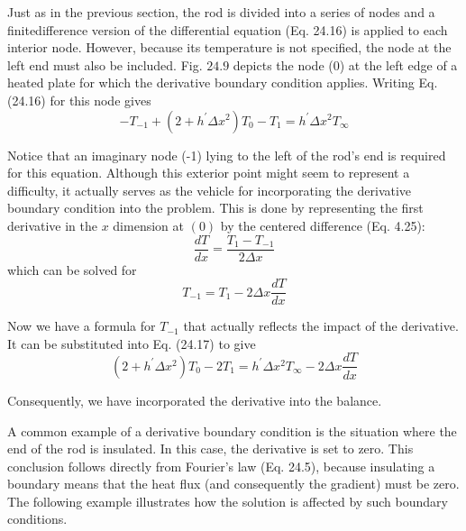 \documentclass[../main.tex]{subfiles}
\begin{document}
Just as in the previous section, the rod is divided into a series of nodes and a finitedifference version of the differential equation (Eq. 24.16) is applied to each interior node. However, because its temperature is not specified, the node at the left end must also be included. Fig. $24.9$ depicts the node (0) at the left edge of a heated plate for which the derivative boundary condition applies. Writing Eq. (24.16) for this node gives
\begin{equation}
    \tag{24.17}
    -T_{-1}+\left(2+h^{\prime} \Delta x^{2}\right) T_{0}-T_{1}=h^{\prime} \Delta x^{2} T_{\infty}
\end{equation}

Notice that an imaginary node (-1) lying to the left of the rod's end is required for this equation. Although this exterior point might seem to represent a difficulty, it actually serves as the vehicle for incorporating the derivative boundary condition into the problem. This is done by representing the first derivative in the $x$ dimension at $(0)$ by the centered difference (Eq. 4.25):
$$
\frac{d T}{d x}=\frac{T_{1}-T_{-1}}{2 \Delta x}
$$
which can be solved for
$$
T_{-1}=T_{1}-2 \Delta x \frac{d T}{d x}
$$

Now we have a formula for $T_{-1}$ that actually reflects the impact of the derivative. It can be substituted into Eq. (24.17) to give
\begin{equation}
    \tag{24.18}
    \left(2+h^{\prime} \Delta x^{2}\right) T_{0}-2 T_{1}=h^{\prime} \Delta x^{2} T_{\infty}-2 \Delta x \frac{d T}{d x}
\end{equation}

\noindent Consequently, we have incorporated the derivative into the balance.

A common example of a derivative boundary condition is the situation where the end of the rod is insulated. In this case, the derivative is set to zero. This conclusion follows directly from Fourier's law (Eq. 24.5), because insulating a boundary means that the heat flux (and consequently the gradient) must be zero. The following example illustrates how the solution is affected by such boundary conditions.
\end{document}
